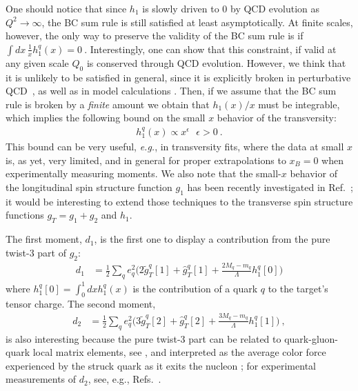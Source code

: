 \documentclass[preprintnumbers,floatfix,nofootinbib]{revtex4}
\newcommand{\eg}{{\em e.g.}}
\newcommand{\mj}{M_q}
\newcommand{\mq}{m_q}
\begin{document}
One should notice that since $h_1$ is slowly driven to 0 by QCD evolution as $Q^2 \to \infty$, the BC sum rule is still satisfied at least
asymptotically.
At finite scales, however, the only way to preserve the validity of the
BC sum rule is if
$
   \int dx\, \frac{1}{x} h_1^q(x) = 0 \ .
\label{eq:ABsumrule}
$
Interestingly, one can show that this constraint, if valid at any given scale
$Q_0$ is conserved through QCD evolution. However, we think that it is unlikely to be satisfied in general, since it is explicitly broken in perturbative QCD~\cite{Kundu:2001pk}, as well as in model calculations \cite{Schweitzer:2001sr,Wakamatsu:2007nc,Pasquini:2005dk,Cloet:2007em,Bacchetta:2008af,Bourrely:2010ng}. Then, if we assume that the BC sum rule is broken by a {\em finite} amount we obtain that $h_1(x)/x$ must be integrable, which implies the following bound on the small $x$ behavior of the transversity: 
\begin{align}
  h_1^q(x) \propto x^\epsilon \ \ \ \epsilon>0 \ .
\label{eq:ABbound}
\end{align}
This bound can be very useful, \eg, in transversity fits, where the data at
small $x$ is, as yet, very limited, and in general for proper extrapolations
to $x_B=0$ when experimentally measuring moments. We also note that the small-$x$ behavior of the longitudinal spin structure function $g_1$ has been recently investigated in Ref.~\cite{Kovchegov:2016zex}; it would be interesting to extend those techniques to the transverse spin structure functions $g_T=g_1+g_2$ and $h_1$.

The first moment, $d_1$, is the first one to display a contribution from the pure twist-3 part of $g_2$:
\begin{align}
  d_1 & = \frac12 \sum_q e_q^2 \bigg( 2 \tilde g_T^q[1] + \hat g_T^q[1] 
    + \frac{2\mj-\mq}{\Lambda} h_1^q[0] \bigg)
\label{e:d1}
\end{align}
where $h_1^q[0] = \int_0^1 dx h_1^q(x)$ is the contribution of a quark $q$ to the target's tensor charge. The second moment,
\begin{align}
  d_2 & = \frac12 \sum_q e_q^2 \bigg( 3 \tilde g_T^q[2] + \hat g_T^q[2] 
    + \frac{3\mj-\mq}{\Lambda} h_1^q[1] \bigg) \ ,
\end{align}
is also interesting because the pure twist-3 part can be related to quark-gluon-quark local matrix elements, see \cite{Jaffe:1996zw}, and
interpreted as the average color force experienced by the struck quark as
it exits the nucleon \cite{Burkardt:2012sd}; for experimental
measurements of $d_2$, see, e.g., Refs.~\cite{Anthony:2002hy,Slifer:2008xu,Solvignon:2013yun,Posik:2014usi,Flay:2016wie}. 
\end{document}
